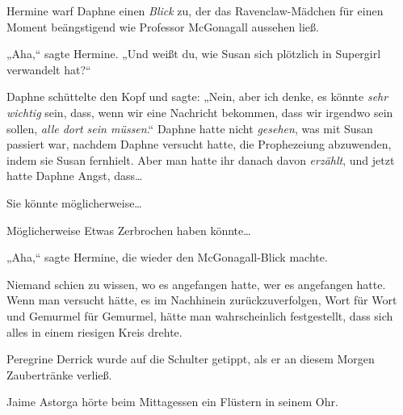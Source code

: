 Hermine warf Daphne einen \emph{Blick} zu, der das Ravenclaw-Mädchen für einen Moment beängstigend wie Professor McGonagall aussehen ließ.

„Aha,“ sagte Hermine. „Und weißt du, wie Susan sich plötzlich in Supergirl verwandelt hat?“

Daphne schüttelte den Kopf und sagte: „Nein, aber ich denke, es könnte \emph{sehr wichtig} sein, dass, wenn wir eine Nachricht bekommen, dass wir irgendwo sein sollen, \emph{alle dort sein müssen}.“ Daphne hatte nicht \emph{gesehen}, was mit Susan passiert war, nachdem Daphne versucht hatte, die Prophezeiung abzuwenden, indem sie Susan fernhielt. Aber man hatte ihr danach davon \emph{erzählt}, und jetzt hatte Daphne Angst, dass…

Sie könnte möglicherweise…

Möglicherweise Etwas Zerbrochen haben könnte…

„Aha,“ sagte Hermine, die wieder den McGonagall-Blick machte.

\later

Niemand schien zu wissen, wo es angefangen hatte, wer es angefangen hatte. Wenn man versucht hätte, es im Nachhinein zurückzuverfolgen, Wort für Wort und Gemurmel für Gemurmel, hätte man wahrscheinlich festgestellt, dass sich alles in einem riesigen Kreis drehte.

Peregrine Derrick wurde auf die Schulter getippt, als er an diesem Morgen Zaubertränke verließ.

Jaime Astorga hörte beim Mittagessen ein Flüstern in seinem Ohr.

